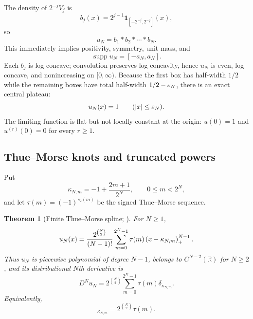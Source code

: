 \documentclass[11pt,oneside]{article}
\numberwithin{equation}{section}
\newtheorem{theorem}{Theorem}[section]
\theoremstyle{definition}
\theoremstyle{remark}
\newcommand{\R}{\mathbb R}
\newcommand{\supp}{\operatorname{supp}}
\newcommand{\wt}{s_2}
\begin{document}
The density of $2^{-j}V_j$ is
\begin{equation}
 b_j(x)=2^{j-1}\mathbf 1_{[-2^{-j},2^{-j}]}(x),
 \label{p5:eq:boxes}
\end{equation}
so
\begin{equation}
 u_N=b_1*b_2*\cdots*b_N.
 \label{p5:eq:convolution}
\end{equation}
This immediately implies positivity, symmetry, unit mass, and
\begin{equation}
 \supp u_N=[-a_N,a_N].
 \label{p5:eq:support}
\end{equation}
Each $b_j$ is log-concave; convolution preserves log-concavity, hence $u_N$ is even, log-concave, and nonincreasing on $[0,\infty)$.  Because the first box has half-width $1/2$ while the remaining boxes have total half-width $1/2-\varepsilon_N$, there is an exact central plateau:
\begin{equation}
 u_N(x)=1\qquad (\left\lvert x\right\rvert\le\varepsilon_N).
 \label{p5:eq:plateau}
\end{equation}
The limiting function is flat but not locally constant at the origin: $u(0)=1$ and $u^{(r)}(0)=0$ for every $r\ge1$.

\subsection{Thue--Morse knots and truncated powers}

Put
\begin{equation}
 \kappa_{N,m}=-1+\frac{2m+1}{2^N},
 \qquad 0\le m<2^N,
 \label{p5:eq:knots}
\end{equation}
and let $\tau(m)=(-1)^{\wt(m)}$ be the signed Thue--Morse sequence.

\begin{theorem}[Finite Thue--Morse spline; \baseline]
For $N\ge1$,
\begin{equation}
 u_N(x)=\frac{2^{\binom N2}}{(N-1)!}
 \sum_{m=0}^{2^N-1}\tau(m)\left(x-\kappa_{N,m}\right)_{+}^{N-1}.
 \label{p5:eq:spline-formula}
\end{equation}
Thus $u_N$ is piecewise polynomial of degree $N-1$, belongs to $C^{N-2}(\R)$ for $N\ge2$, and its distributional $N$th derivative is
\begin{equation}
 D^Nu_N=2^{\binom N2}\sum_{m=0}^{2^N-1}\tau(m)\delta_{\kappa_{N,m}}.
 \label{p5:eq:distributional-derivative}
\end{equation}
Equivalently,
\begin{equation}
 [u_N^{(N-1)}]_{\kappa_{N,m}}
 =2^{\binom N2}\tau(m).
 \label{p5:eq:jumps}
\end{equation}
\end{theorem}
\end{document}
